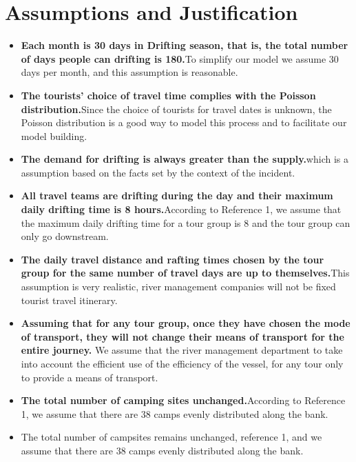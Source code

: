 \section{Assumptions and Justification}

\begin{itemize} 
	
    \item \textbf{Each month is 30 days in Drifting season, that is, the total number of days people can drifting is 180.}To simplify our model we assume 30 days per month, and this assumption is reasonable.
    
    \item \textbf{The tourists' choice of travel time complies with the Poisson distribution.}Since the choice of tourists for travel dates is unknown, the Poisson distribution is a good way to model this process and to facilitate our model building.
    
    \item \textbf{The demand for drifting is always greater than the supply.}which is a assumption based on the facts set by the context of the incident.
    
    \item \textbf{All travel teams are drifting during the day and their maximum daily drifting time is 8 hours.}According to Reference 1, we assume that the maximum daily drifting time for a tour group is 8 and the tour group can only go downstream.
    
    \item \textbf{The daily travel distance and rafting times chosen by the tour group for the same number of travel days are up to themselves.}This assumption is very realistic, river management companies will not be fixed tourist travel itinerary.
    
	\item \textbf{Assuming that for any tour group, once they have chosen the mode of transport, they will not change their means of transport for the entire journey. }We assume that the river management department to take into account the efficient use of the efficiency of the vessel, for any tour only to provide a means of transport.
	
	\item \textbf{The total number of camping sites unchanged.}According to Reference 1, we assume that there are 38 camps evenly distributed along the bank.
	
	\item The total number of campsites remains unchanged, reference 1, and we assume that there are 38 camps evenly distributed along the bank. 
\end{itemize}